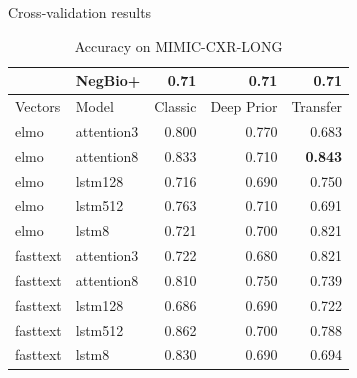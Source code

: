 \documentclass[pdf]{beamer}
\newcommand{\?}{\ensuremath{^\texttt{\bf [CITATION~NEEDED]}}}
\begin{document}
\begin{frame}{Cross-validation results}

\begin{table}
\caption{Accuracy on MIMIC-CXR-LONG}
\label{mimic-long-accuracy}
\begin{tabular}{llrrr}
\toprule
 & NegBio+ & 0.71  & 0.71 & 0.71  \\
\midrule
Vectors &        Model       &  Classic &  Deep Prior &  Transfer \\
\midrule
                   elmo &  attention3 &    0.800 &       0.770 &     0.683 \\
                   elmo &  attention8 &    0.833 &       0.710 &     \textbf{0.843} \\
                   elmo &     lstm128 &    0.716 &       0.690 &     0.750 \\
                   elmo &     lstm512 &    0.763 &       0.710 &     0.691 \\
                   elmo &       lstm8 &    0.721 &       0.700 &     0.821 \\
               fasttext &  attention3 &    0.722 &       0.680 &     0.821 \\
               fasttext &  attention8 &    0.810 &       0.750 &     0.739 \\
               fasttext &     lstm128 &    0.686 &       0.690 &     0.722 \\
               fasttext &     lstm512 &    0.862 &       0.700 &     0.788 \\
               fasttext &       lstm8 &    0.830 &       0.690 &     0.694 \\
\bottomrule
\end{tabular}
\end{table}

\end{frame}
\end{document}
